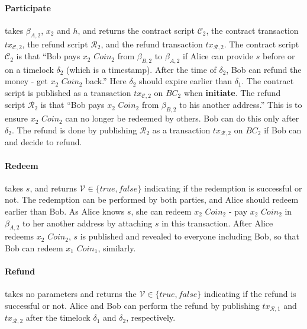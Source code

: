 \paragraph{\textbf{Participate}}
takes $\beta_{A, 2}$, $x_2$ and $h$,
and returns the contract script $\mathcal{C}_2$, the contract transaction $tx_{\mathcal{C}, 2}$, the refund script $\mathcal{R}_2$, and the refund transaction $tx_{\mathcal{R}, 2}$.
The contract script $\mathcal{C}_2$ is that ``Bob pays $x_2$ $Coin_2$ from $\beta_{B, 2}$ to $\beta_{A, 2}$ if Alice can provide $s$ before or on a timelock $\delta_2$ (which is a timestamp). After the time of $\delta_2$, Bob can refund the money - get $x_2$ $Coin_2$ back.''
Here $\delta_2$ should expire earlier than $\delta_1$.
The contract script is published as a transaction $tx_{\mathcal{C}, 2}$ on $BC_2$ when \textbf{initiate}.
The refund script $\mathcal{R}_2$ is that ``Bob pays $x_2$ $Coin_2$ from $\beta_{B, 2}$ to his another address.'' This is to ensure $x_2$ $Coin_2$ can no longer be redeemed by others. Bob can do this only after $\delta_2$.
The refund is done by publishing $\mathcal{R}_2$ as a transaction $tx_{\mathcal{R}, 2}$ on $BC_2$ if Bob can and decide to refund.


\paragraph{\textbf{Redeem}}
takes $s$,
and returns $\mathcal{V} \in \{true, false\}$ indicating if the redemption is successful or not.
The redemption can be performed by both parties, and Alice should redeem earlier than Bob.
As Alice knows $s$, she can redeem $x_2$ $Coin_2$ - pay $x_2$ $Coin_2$ in $\beta_{A, 2}$ to her another address by attaching $s$ in this transaction.
After Alice redeems $x_2$ $Coin_2$, $s$ is published and revealed to everyone including Bob, so that Bob can redeem $x_1$ $Coin_1$, similarly.

\paragraph{\textbf{Refund}}
takes no parameters and returns the $\mathcal{V} \in \{true, false\}$ indicating if the refund is successful or not.
Alice and Bob can perform the refund by publishing $tx_{\mathcal{R}, 1}$ and $tx_{\mathcal{R}, 2}$ after the timelock $\delta_1$ and $\delta_2$, respectively.

